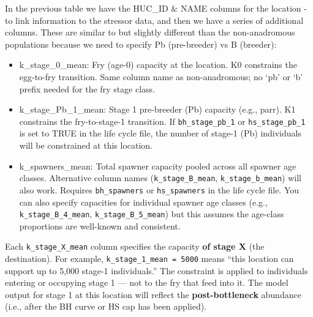 \documentclass[
  letterpaper,
  DIV=11,
  numbers=noendperiod]{scrreprt}
\begin{document}
In the previous table we have the HUC\_ID \& NAME columns for the
location - to link information to the stressor data, and then we have a
series of additional columns. These are similar to but slightly
different than the non-anadromous populations because we need to specify
Pb (pre-breeder) vs B (breeder):

\begin{itemize}
\item
  k\_stage\_0\_mean: Fry (age-0) capacity at the location. K0 constrains
  the egg-to-fry transition. Same column name as non-anadromous; no `pb'
  or `b' prefix needed for the fry stage class.
\item
  k\_stage\_Pb\_1\_mean: Stage 1 pre-breeder (Pb) capacity (e.g., parr).
  K1 constrains the fry-to-stage-1 transition. If
  \texttt{bh\_stage\_pb\_1} or \texttt{hs\_stage\_pb\_1} is set to TRUE
  in the life cycle file, the number of stage-1 (Pb) individuals will be
  constrained at this location.
\item
  k\_spawners\_mean: Total spawner capacity pooled across all spawner
  age classes. Alternative column names (\texttt{k\_stage\_B\_mean},
  \texttt{k\_stage\_b\_mean}) will also work. Requires
  \texttt{bh\_spawners} or \texttt{hs\_spawners} in the life cycle file.
  You can also specify capacities for individual spawner age classes
  (e.g., \texttt{k\_stage\_B\_4\_mean}, \texttt{k\_stage\_B\_5\_mean})
  but this assumes the age-class proportions are well-known and
  consistent.
\end{itemize}

\begin{tcolorbox}[enhanced jigsaw, colbacktitle=quarto-callout-important-color!10!white, title=\textcolor{quarto-callout-important-color}{\faExclamation}\hspace{0.5em}{Reminder: Column Names = Destination Stage Capacity}, colframe=quarto-callout-important-color-frame, bottomrule=.15mm, opacityback=0, breakable, bottomtitle=1mm, arc=.35mm, opacitybacktitle=0.6, titlerule=0mm, colback=white, rightrule=.15mm, left=2mm, leftrule=.75mm, toprule=.15mm, toptitle=1mm, coltitle=black]

Each \texttt{k\_stage\_X\_mean} column specifies the capacity \textbf{of
stage X} (the destination). For example,
\texttt{k\_stage\_1\_mean\ =\ 5000} means ``this location can support up
to 5,000 stage-1 individuals.'' The constraint is applied to individuals
entering or occupying stage 1 --- not to the fry that feed into it. The
model output for stage 1 at this location will reflect the
\textbf{post-bottleneck} abundance (i.e., after the BH curve or HS cap
has been applied).

\end{tcolorbox}
\end{document}

